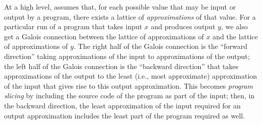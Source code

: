 At a high level, \GPS assumes that, for each possible value that may be input or output by a program, there exists a lattice of {\em approximations} of that value. For a particular run of a program that takes input $x$ and produces output $y$, we also get a Galois connection between the lattice of approximations of $x$ and the lattice of approximations of $y$. The right half of the Galois connection is the ``forward direction'' taking approximations of the input to approximations of the output; the left half of the Galois connection is the ``backward direction'' that takes approximations of the output to the least (i.e., most approximate) approximation of the input that gives rise to this output approximation. This becomes {\em program slicing} by including the source code of the program as part of the input; then, in the backward direction, the least approximation of the input required for an output approximation includes the least part of the program required as well.

